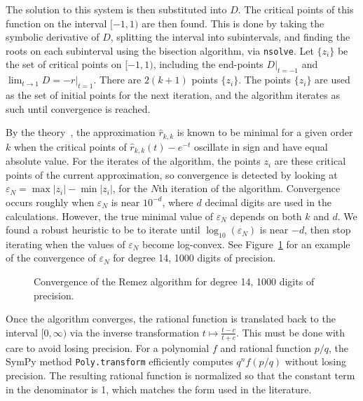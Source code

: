The solution to this system is then substituted into $D$. The critical points
of this function on the interval $[-1, 1)$ are then found. This is done by
taking the symbolic derivative of $D$, splitting the interval into
subintervals, and finding the roots on each subinterval using the bisection
algorithm, via \texttt{nsolve}. Let $\{z_i\}$ be the set of critical points on
$[-1, 1)$, including the end-points $D|_{t=-1}$ and
$\lim_{t\to 1} D=-r|_{t=1}$. There are $2(k+1)$ points $\{z_i\}$. The points
$\{z_i\}$ are used as the set of initial points for the next iteration, and
the algorithm iterates as such until convergence is reached.

By the theory~\cite{ationneeded}, the approximation $\hat{r}_{k, k}$ is known
to be minimal for a given order $k$ when the critical points of
$\hat{r}_{k, k}(t) - e^{-t}$ oscillate in sign and have equal absolute value.
For the iterates of the algorithm, the points $z_i$ are these critical points
of the current approximation, so convergence is detected by looking at
$\varepsilon_N = \max{|z_i|} - \min{|z_i|}$, for the $N$th iteration of the
algorithm. Convergence occurs roughly when $\varepsilon_N$ is near $10^{-d}$,
where $d$ decimal digits are used in the calculations. However, the true
minimal value of $\varepsilon_N$ depends on both $k$ and $d$. We found a
robust heuristic to be to iterate until $\log_{10}{(\varepsilon_N)}$ is near
$-d$, then stop iterating when the values of $\varepsilon_N$ become
log-convex. See Figure~\ref{fig:convergence-14-1000} for an example of the
convergence of $\varepsilon_N$ for degree 14, 1000 digits of precision.

\begin{figure}[!ht]
\centering
\resizebox{0.9\textwidth}{!}{}
\caption{Convergence of the Remez algorithm for degree 14, 1000 digits of
  precision.}
\label{fig:convergence-14-1000}
\end{figure}

Once the algorithm converges, the rational function is translated back to the
interval $[0, \infty)$ via the inverse transformation $t\mapsto \frac{t - c}{t
  + c}$. This must be done with care to avoid losing precision. For a
polynomial $f$ and rational function $p/q$, the SymPy
method \texttt{Poly.transform} efficiently computes
$q^nf\left(p/q\right)$ without losing precision. The resulting
rational function is normalized so that the constant term in the denominator
is 1, which matches the form used in the literature.~\cite{ationneeded}

